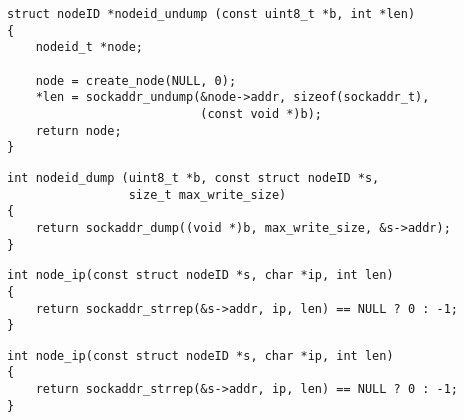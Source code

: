 \begin{lstlisting}
struct nodeID *nodeid_undump (const uint8_t *b, int *len)
{
    nodeid_t *node;

    node = create_node(NULL, 0);
    *len = sockaddr_undump(&node->addr, sizeof(sockaddr_t),
                           (const void *)b);
    return node;
}
\end{lstlisting}

\begin{lstlisting}
int nodeid_dump (uint8_t *b, const struct nodeID *s,
                 size_t max_write_size)
{
    return sockaddr_dump((void *)b, max_write_size, &s->addr);
}
\end{lstlisting}

\begin{lstlisting}
int node_ip(const struct nodeID *s, char *ip, int len)
{
    return sockaddr_strrep(&s->addr, ip, len) == NULL ? 0 : -1;
}
\end{lstlisting}

\begin{lstlisting}
int node_ip(const struct nodeID *s, char *ip, int len)
{
    return sockaddr_strrep(&s->addr, ip, len) == NULL ? 0 : -1;
}
\end{lstlisting}
